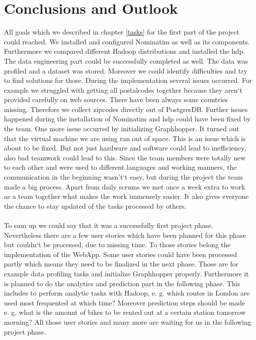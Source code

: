 
\section{Conclusions and Outlook}

All goals which we described in chapter \ref{tasks} for the first part of the project could reached. We installed and configured Nominatim as well as its components. Furthermore we compared different Hadoop distributions and installed the \acs{hdp}. The data engineering part could be successfully completed as well. The data was profiled and a dataset was stored. Moreover we could identify difficulties and try to find solutions for those. During the implementation several issues occurred. For example we struggled with getting all postalcodes together because they aren`t provided carefully on web sources. There have been always some countries missing. Therefore we collect zipcodes directly out of PostgresDB. Further issues happened during the installation of Nominatim and \acs{hdp} could have been fixed by the team. One more issue occurred by initializing Graphhopper. It turned out that the virtual machine we are using ran out of space. This is an issue which is about to be fixed. But not just hardware and software could lead to inefficiency, also bad teamwork could lead to this. Since the team members were totally new to each other and were used to different languages and working manners, the communication in the beginning wasn't`t easy, but during the project the team made a big process. Apart from daily scrums we met once a week extra to work as a team together what makes the work immensely easier. It also gives everyone the chance to stay updated of the tasks processed by others.\\\\ To sum up we could say that it was a successfully first project phase.\\Nevertheless there are a few user stories which have been planned for this phase but couldn`t be processed, due to missing time. To those stories belong the implementation of the WebApp. Some user stories could have been processed partly which means they need to be finalized in the next phase. Those are for example data profiling tasks and initialize Graphhopper properly. 
Furthermore it is planned to do the analytics and prediction part in the following phase. This includes to perform analytic tasks with Hadoop, e. g. which routes in London are used most frequented at which time?
Moreover prediction steps should be made e. g. what is the amount of bikes to be rented out at a certain station tomorrow morning?
All those user stories and many more are waiting for us in the following project phase.
